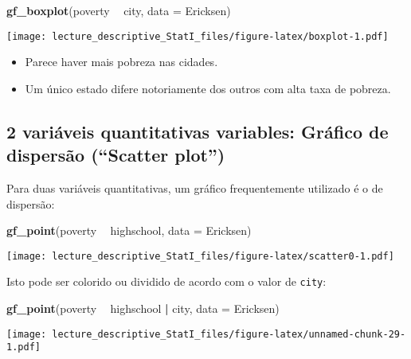 \documentclass[]{article}
\newenvironment{Shaded}{\begin{snugshade}}{\end{snugshade}}
\newcommand{\KeywordTok}[1]{\textcolor[rgb]{0.13,0.29,0.53}{\textbf{#1}}}
\newcommand{\DataTypeTok}[1]{\textcolor[rgb]{0.13,0.29,0.53}{#1}}
\newcommand{\StringTok}[1]{\textcolor[rgb]{0.31,0.60,0.02}{#1}}
\newcommand{\OperatorTok}[1]{\textcolor[rgb]{0.81,0.36,0.00}{\textbf{#1}}}
\newcommand{\NormalTok}[1]{#1}
\providecommand{\tightlist}{%
  \setlength{\itemsep}{0pt}\setlength{\parskip}{0pt}}
\begin{document}
\begin{Shaded}
\begin{Highlighting}[]
\KeywordTok{gf_boxplot}\NormalTok{(poverty }\OperatorTok{~}\StringTok{ }\NormalTok{city, }\DataTypeTok{data =}\NormalTok{ Ericksen)}
\end{Highlighting}
\end{Shaded}

\texttt{[image: lecture\_descriptive\_StatI\_files/figure-latex/boxplot-1.pdf]}

\begin{itemize}
\tightlist
\item
  Parece haver mais pobreza nas cidades.
\item
  Um único estado difere notoriamente dos outros com alta taxa de
  pobreza.
\end{itemize}

\subsection{\texorpdfstring{2 variáveis quantitativas variables: Gráfico
de dispersão (``Scatter
plot'')}{2 variáveis quantitativas variables: Gráfico de dispersão (Scatter plot)}}\label{variaveis-quantitativas-variables-grafico-de-dispersao-scatter-plot}

Para duas variáveis quantitativas, um gráfico frequentemente utilizado é
o de dispersão:

\begin{Shaded}
\begin{Highlighting}[]
\KeywordTok{gf_point}\NormalTok{(poverty }\OperatorTok{~}\StringTok{ }\NormalTok{highschool, }\DataTypeTok{data =}\NormalTok{ Ericksen)}
\end{Highlighting}
\end{Shaded}

\texttt{[image: lecture\_descriptive\_StatI\_files/figure-latex/scatter0-1.pdf]}

Isto pode ser colorido ou dividido de acordo com o valor de
\texttt{city}:

\begin{Shaded}
\begin{Highlighting}[]
\KeywordTok{gf_point}\NormalTok{(poverty }\OperatorTok{~}\StringTok{ }\NormalTok{highschool }\OperatorTok{|}\StringTok{ }\NormalTok{city, }\DataTypeTok{data =}\NormalTok{ Ericksen)}
\end{Highlighting}
\end{Shaded}

\texttt{[image: lecture\_descriptive\_StatI\_files/figure-latex/unnamed-chunk-29-1.pdf]}
\end{document}
